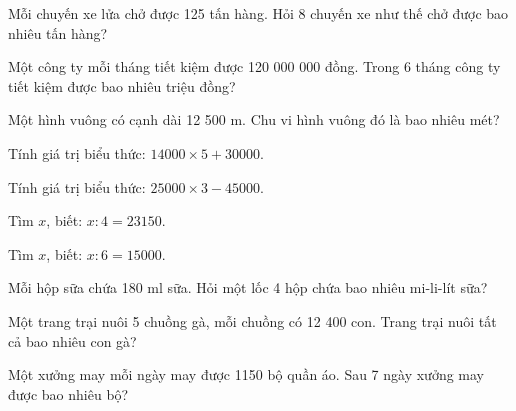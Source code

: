 \begin{ex}
Mỗi chuyến xe lửa chở được 125 tấn hàng. Hỏi 8 chuyến xe như thế chở được bao nhiêu tấn hàng?
\end{ex}

\begin{ex}
Một công ty mỗi tháng tiết kiệm được 120 000 000 đồng. Trong 6 tháng công ty tiết kiệm được bao nhiêu triệu đồng?
\end{ex}

\begin{ex}
Một hình vuông có cạnh dài 12 500 m. Chu vi hình vuông đó là bao nhiêu mét?
\end{ex}

\begin{ex}
Tính giá trị biểu thức: $14000 \times 5 + 30000$.
\end{ex}

\begin{ex}
Tính giá trị biểu thức: $25000 \times 3 - 45000$.
\end{ex}

\begin{ex}
Tìm $x$, biết: $x : 4 = 23150$.
\end{ex}

\begin{ex}
Tìm $x$, biết: $x : 6 = 15000$.
\end{ex}

\begin{ex}
Mỗi hộp sữa chứa 180 ml sữa. Hỏi một lốc 4 hộp chứa bao nhiêu mi-li-lít sữa?
\end{ex}

\begin{ex}
Một trang trại nuôi 5 chuồng gà, mỗi chuồng có 12 400 con. Trang trại nuôi tất cả bao nhiêu con gà?
\end{ex}

\begin{ex}
Một xưởng may mỗi ngày may được 1150 bộ quần áo. Sau 7 ngày xưởng may được bao nhiêu bộ?
\end{ex}

